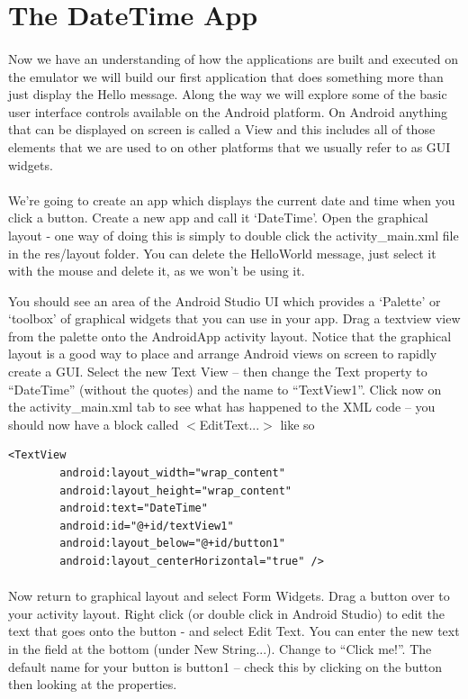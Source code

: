 \section{The DateTime App}
\paragraph{}Now we have an understanding of how the applications are built and executed on the emulator we will build our first application that does something more than just display the Hello message. Along the way we will explore some of the basic user interface controls available on the Android platform. On Android anything that can be displayed on screen is called a View and this includes all of those elements that we are used to on other platforms that we usually refer to as GUI widgets.

\paragraph{} We're going to create an app which displays the current date and time when you click a button. Create a new app and call it `DateTime'. Open the graphical layout - one way of doing this is simply to double click the activity\_main.xml file in the res/layout folder. You can delete the HelloWorld message, just select it with the mouse and delete it, as we won't be using it.

You should see an area of the Android Studio UI which provides a `Palette' or `toolbox' of graphical widgets that you can use in your app. Drag a textview view from the palette onto the AndroidApp activity layout. Notice that the graphical layout is a good way to place and arrange Android views on screen to rapidly create a GUI. Select the new Text View – then change the Text property to ``DateTime'' (without the quotes) and the name to ``TextView1''. Click now on the activity\_main.xml tab to see what has happened to the XML code – you should now have a block called $<$EditText...$>$ like so

\begin{lstlisting}
<TextView
        android:layout_width="wrap_content"
        android:layout_height="wrap_content"
        android:text="DateTime"
        android:id="@+id/textView1"
        android:layout_below="@+id/button1"
        android:layout_centerHorizontal="true" />
\end{lstlisting}

\paragraph{} Now return to graphical layout and select Form Widgets. Drag a button over to your activity layout.  Right click (or double click in Android Studio) to edit the text that goes onto the button - and select Edit Text. You can enter the new text in the field at the bottom (under New String...). Change to ``Click me!''. The default name for your button is button1 – check this by clicking on the button then looking at the properties.

